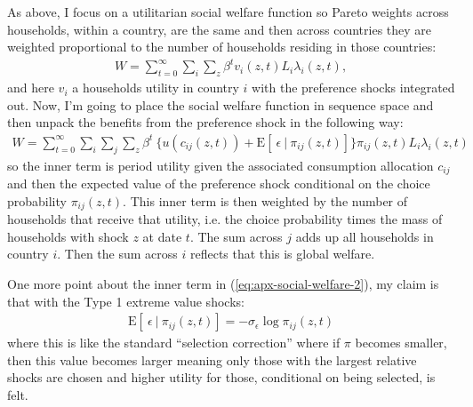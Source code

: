 \documentclass[12pt,pdftex]{article}
\begin{document}
\begin{onehalfspacing}
As above, I focus on a utilitarian social welfare function so Pareto weights across households, within a country, are the same and then across countries they are weighted proportional to the number of households residing in those countries:
\begin{align}
W = \sum_{t=0}^{\infty} \sum_{i} \sum_{z} \beta^{t} v_{i}(z,t) L_{i}\lambda_{i}(z,t),
\label{eq:apx-social-welfare}
\end{align}
and here $v_i$ a households utility in country $i$ with the preference shocks integrated out. Now, I'm going to place the social welfare function in sequence space and then unpack the benefits from the preference shock in the following way:
\begin{align}
W = \sum_{t=0}^{\infty}  \sum_{i} \sum_{j} \sum\limits_{z}  \beta^{t} \  \bigg \{  u(c_{ij}(z, t) ) + \mathrm{E}[ \ \epsilon \ | \ \pi_{ij}(z,t) ] \bigg \}\pi_{ij}(z,t) L_{i} \lambda_{i}(z, t)
\label{eq:apx-social-welfare-2}
\end{align}
so the inner term is period utility given the associated consumption allocation $c_{ij}$ and then the expected value of the preference shock conditional on the choice probability $\pi_{ij}(z,t)$. This inner term is then weighted by the number of households that receive that utility, i.e. the choice probability times the mass of households with shock $z$ at date $t$. The sum across $j$ adds up all households in country $i$. Then the sum across $i$ reflects that this is global welfare.

One more point about the inner term in (\ref{eq:apx-social-welfare-2}), my claim is that with the Type 1 extreme value shocks:
\begin{align}
\mathrm{E}[ \ \epsilon \ | \ \pi_{ij}(z,t) ] = -\sigma_{\epsilon} \log \pi_{ij}(z,t)
\end{align}
where this is like the standard ``selection correction'' where if $\pi$ becomes smaller, then this value becomes larger meaning only those with the largest relative shocks are chosen and higher utility for those, conditional on being selected, is felt. 


\end{onehalfspacing}
\end{document}
